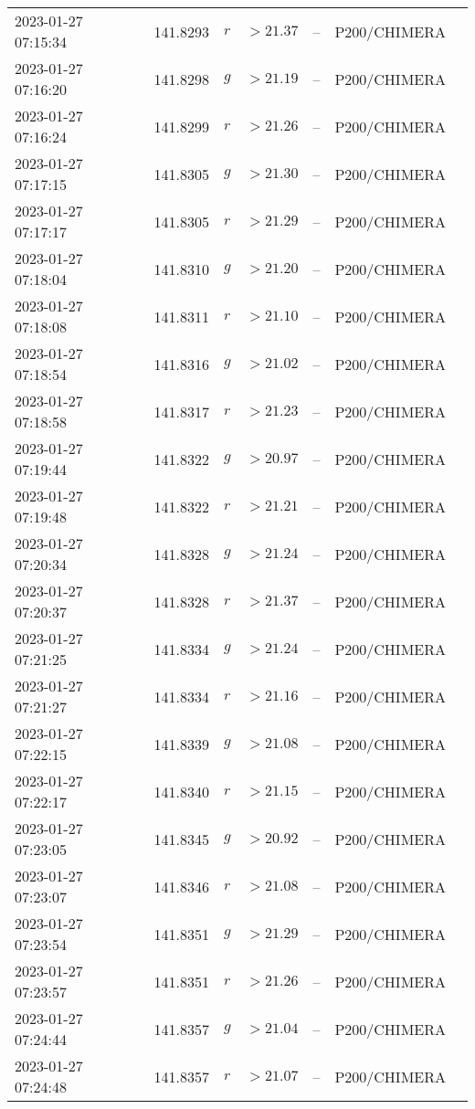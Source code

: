 \documentclass{nature_plusfigure}
\begin{document}
\begin{supplement}
\begin{center}
\begin{longtable}{lllllll}
2023-01-27 07:15:34 & 141.8293 & $r$ & $>21.37$ & -- & P200/CHIMERA &  \\ 
2023-01-27 07:16:20 & 141.8298 & $g$ & $>21.19$ & -- & P200/CHIMERA &  \\ 
2023-01-27 07:16:24 & 141.8299 & $r$ & $>21.26$ & -- & P200/CHIMERA &  \\ 
2023-01-27 07:17:15 & 141.8305 & $g$ & $>21.30$ & -- & P200/CHIMERA &  \\ 
2023-01-27 07:17:17 & 141.8305 & $r$ & $>21.29$ & -- & P200/CHIMERA &  \\ 
2023-01-27 07:18:04 & 141.8310 & $g$ & $>21.20$ & -- & P200/CHIMERA &  \\ 
2023-01-27 07:18:08 & 141.8311 & $r$ & $>21.10$ & -- & P200/CHIMERA &  \\ 
2023-01-27 07:18:54 & 141.8316 & $g$ & $>21.02$ & -- & P200/CHIMERA &  \\ 
2023-01-27 07:18:58 & 141.8317 & $r$ & $>21.23$ & -- & P200/CHIMERA &  \\ 
2023-01-27 07:19:44 & 141.8322 & $g$ & $>20.97$ & -- & P200/CHIMERA &  \\ 
2023-01-27 07:19:48 & 141.8322 & $r$ & $>21.21$ & -- & P200/CHIMERA &  \\ 
2023-01-27 07:20:34 & 141.8328 & $g$ & $>21.24$ & -- & P200/CHIMERA &  \\ 
2023-01-27 07:20:37 & 141.8328 & $r$ & $>21.37$ & -- & P200/CHIMERA &  \\ 
2023-01-27 07:21:25 & 141.8334 & $g$ & $>21.24$ & -- & P200/CHIMERA &  \\ 
2023-01-27 07:21:27 & 141.8334 & $r$ & $>21.16$ & -- & P200/CHIMERA &  \\ 
2023-01-27 07:22:15 & 141.8339 & $g$ & $>21.08$ & -- & P200/CHIMERA &  \\ 
2023-01-27 07:22:17 & 141.8340 & $r$ & $>21.15$ & -- & P200/CHIMERA &  \\ 
2023-01-27 07:23:05 & 141.8345 & $g$ & $>20.92$ & -- & P200/CHIMERA &  \\ 
2023-01-27 07:23:07 & 141.8346 & $r$ & $>21.08$ & -- & P200/CHIMERA &  \\ 
2023-01-27 07:23:54 & 141.8351 & $g$ & $>21.29$ & -- & P200/CHIMERA &  \\ 
2023-01-27 07:23:57 & 141.8351 & $r$ & $>21.26$ & -- & P200/CHIMERA &  \\ 
2023-01-27 07:24:44 & 141.8357 & $g$ & $>21.04$ & -- & P200/CHIMERA &  \\ 
2023-01-27 07:24:48 & 141.8357 & $r$ & $>21.07$ & -- & P200/CHIMERA &  \\ 

\end{longtable}
\end{center}
\end{supplement}
\end{document}
